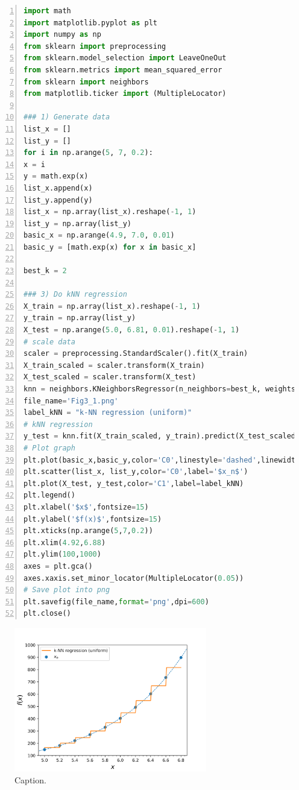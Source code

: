 \documentclass{article}%
\begin{document}
\begin{lstlisting}[language=Python, caption=Code3,backgroundcolor=\color{lightgrey},keywordstyle=\color{darkgreen},commentstyle=\color{red},
showspaces=false,numbers=left,stringstyle=\color{purple}]
import math
import matplotlib.pyplot as plt
import numpy as np
from sklearn import preprocessing
from sklearn.model_selection import LeaveOneOut
from sklearn.metrics import mean_squared_error
from sklearn import neighbors
from matplotlib.ticker import (MultipleLocator)

### 1) Generate data
list_x = []
list_y = []
for i in np.arange(5, 7, 0.2):
x = i
y = math.exp(x)
list_x.append(x)
list_y.append(y)
list_x = np.array(list_x).reshape(-1, 1)
list_y = np.array(list_y)
basic_x = np.arange(4.9, 7.0, 0.01)
basic_y = [math.exp(x) for x in basic_x]

best_k = 2

### 3) Do kNN regression
X_train = np.array(list_x).reshape(-1, 1)
y_train = np.array(list_y)
X_test = np.arange(5.0, 6.81, 0.01).reshape(-1, 1)
# scale data
scaler = preprocessing.StandardScaler().fit(X_train)
X_train_scaled = scaler.transform(X_train)
X_test_scaled = scaler.transform(X_test)
knn = neighbors.KNeighborsRegressor(n_neighbors=best_k, weights='uniform')
file_name='Fig3_1.png'
label_kNN = "k-NN regression (uniform)"
# kNN regression
y_test = knn.fit(X_train_scaled, y_train).predict(X_test_scaled)
# Plot graph
plt.plot(basic_x,basic_y,color='C0',linestyle='dashed',linewidth=1)
plt.scatter(list_x, list_y,color='C0',label='$x_n$')
plt.plot(X_test, y_test,color='C1',label=label_kNN)
plt.legend()
plt.xlabel('$x$',fontsize=15)
plt.ylabel('$f(x)$',fontsize=15)
plt.xticks(np.arange(5,7,0.2))
plt.xlim(4.92,6.88)
plt.ylim(100,1000)
axes = plt.gca()
axes.xaxis.set_minor_locator(MultipleLocator(0.05))
# Save plot into png
plt.savefig(file_name,format='png',dpi=600)
plt.close()
\end{lstlisting}

\begin{figure}[!htbp]
	\centering
	\includegraphics[width=0.75\textwidth]{figures/Fig3_1.png}
	\caption{Caption.}
	\label{fig:Fig3_1}
\end{figure}
\end{document}
